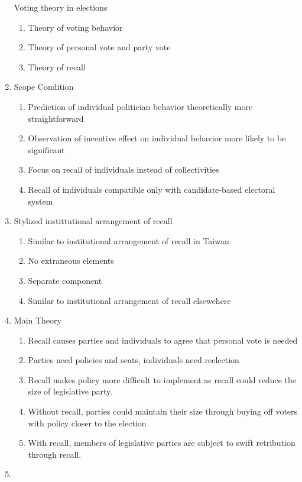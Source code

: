\documentclass[hyphens, crop=false]{standalone}
\begin{document}
\begin{enumerate}
		Voting theory in elections
		\begin{enumerate}
			\item 
			Theory of voting behavior
			\item 
			Theory of personal vote and party vote
			\item 
			Theory of recall
		\end{enumerate}
		\item 
		Scope Condition
		\begin{enumerate}
			\item 
			Prediction of individual politician behavior theoretically more straightforward
			\item 
			Observation of incentive effect on individual behavior more likely to be significant
			\item 
			Focus on recall of individuals instead of collectivities
			\item 
			Recall of individuals compatible only with candidate-based electoral system
		\end{enumerate}
		\item 
		Stylized instittutional arrangement of recall
		\begin{enumerate}
			\item 
			Similar to institutional arrangement of recall in Taiwan
			\item 
			No extraneous elements
			\item 
			Separate component
			\item 
			Similar to institutional arrangement of recall elsewehere
		\end{enumerate}
		\item 
		Main Theory
		\begin{enumerate}
			\item 
			Recall causes parties and individuals to agree that personal vote is needed
			\item 
			Parties need policies and seats, individuals need reelection
			\item 
			Recall makes policy more difficult to implement
			as recall could reduce the size of legislative party.
			\item 
			Without recall, parties could maintain their size through buying off voters with policy closer to the election
			\item 
			With recall, members of legislative parties are subject to swift retribution through recall.
		\end{enumerate}
		\item 

\end{enumerate}
\end{document}

